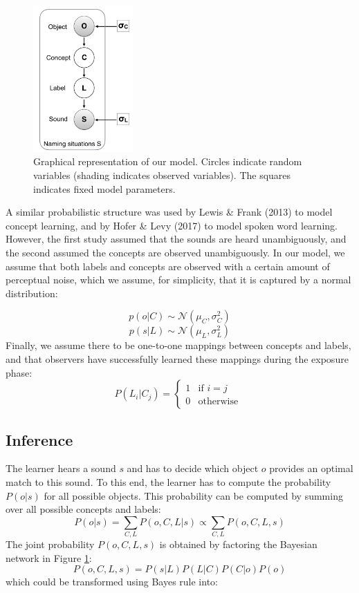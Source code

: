 \documentclass[10pt, letterpaper]{article}
\begin{document}
\begin{figure}
\centering
\includegraphics[width=1.5in]{figs/model.png}
\caption{Graphical representation of our model. Circles indicate random variables (shading indicates observed variables). The squares indicates fixed model parameters.}
\label{fig:model}
\end{figure}

A similar probabilistic structure was used by Lewis \& Frank (2013) to
model concept learning, and by Hofer \& Levy (2017) to model spoken word
learning. However, the first study assumed that the sounds are heard
unambiguously, and the second assumed the concepts are observed
unambiguously. In our model, we assume that both labels and concepts are
observed with a certain amount of perceptual noise, which we assume, for
simplicity, that it is captured by a normal distribution:

\[ p(o | C) \sim  \mathcal{N}(\mu_C, \sigma^2_C) \]
\[ p(s| L) \sim  \mathcal{N}(\mu_L, \sigma^2_L) \] Finally, we assume
there to be one-to-one mappings between concepts and labels, and that
observers have successfully learned these mappings during the exposure
phase: \[
P(L_i|C_j) = 
\begin{cases}
  1 & \text{if  }  i=j \\  
  0  & \text{otherwise  }
\end{cases}
\]

\subsection{Inference}\label{inference}

The learner hears a sound \(s\) and has to decide which object \(o\)
provides an optimal match to this sound. To this end, the learner has to
compute the probability \(P(o|s)\) for all possible objects. This
probability can be computed by summing over all possible concepts and
labels:
\[P(o|s)=\sum_{C,L} P(o, C, L| s) \propto \sum_{C,L} P(o, C, L, s) \]
The joint probability \(P(o, C, L, s)\) is obtained by factoring the
Bayesian network in Figure \ref{fig:model}:
\[P(o,C,L,s) = P(s|L)P(L|C)P(C|o)P(o) \] which could be transformed
using Bayes rule into:
\end{document}
